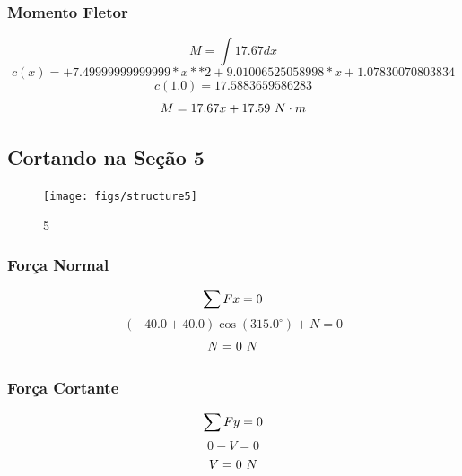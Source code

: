 \documentclass[a4paper,12pt]{article}%
\begin{document}
%
\subsubsection{Momento Fletor}%
\label{ssubsec:MomentoFletor}%
\begin{dmath*}%
M = \int17.67 dx%
\end{dmath*}%
\begin{dmath*}%
c(x) = +7.49999999999999*x**2 + 9.01006525058998*x + 1.07830070803834%
\end{dmath*}%
\begin{dmath*}%
c(1.0) = 17.5883659586283%
\end{dmath*}%
\begin{dmath*}%
M = 17.67 x + 17.59$ $N \cdot m%
\end{dmath*}

%
\subsection{Cortando na Seção 5}%
\label{subsec:CortandonaSeo5}%


\begin{figure}[H]%
\centering%
\texttt{[image: figs/structure5]}%
\caption{\label{fig:secoes}\label{fig:secoes} 5}%
\end{figure}

%
\subsubsection{Força Normal}%
\label{ssubsec:ForaNormal}%
\begin{dmath*}%
\sum{Fx} = 0 \\%
\end{dmath*}%
\begin{dmath*}%
\left(-40.0 + 40.0\right) \cos{\left(315.0 ^\circ \right)} + N = 0%
\end{dmath*}%
\begin{dmath*}%
N = 0$ $N%
\end{dmath*}

%
\subsubsection{Força Cortante}%
\label{ssubsec:ForaCortante}%
\begin{dmath*}%
\sum{Fy} = 0 \\%
\end{dmath*}%
\begin{dmath*}%
0 - V = 0%
\end{dmath*}%
\begin{dmath*}%
V = 0$ $N%
\end{dmath*}
\end{document}

